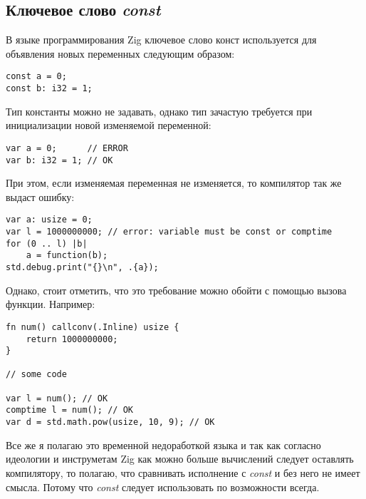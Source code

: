 \subsection{Ключевое слово \textit{const}}

В языке программирования Zig ключевое слово конст используется для объявления новых переменных следующим образом:
\begin{lstlisting}
const a = 0;
const b: i32 = 1;
\end{lstlisting}

Тип константы можно не задавать, однако тип зачастую требуется при инициализации новой изменяемой переменной:
\begin{lstlisting}
var a = 0;      // ERROR
var b: i32 = 1; // ОК
\end{lstlisting}

При этом, если изменяемая переменная не изменяется, то компилятор так же выдаст ошибку:
\begin{lstlisting}
var a: usize = 0;
var l = 1000000000; // error: variable must be const or comptime
for (0 .. l) |b|
    a = function(b);
std.debug.print("{}\n", .{a});
\end{lstlisting}

Однако, стоит отметить, что это требование можно обойти с помощью вызова функции. Например:
\begin{lstlisting}
fn num() callconv(.Inline) usize {
    return 1000000000;
}

// some code

var l = num(); // OK
comptime l = num(); // OK
var d = std.math.pow(usize, 10, 9); // OK
\end{lstlisting}

Все же я полагаю это временной недоработкой языка и так как согласно идеологии и инструметам Zig как можно больше вычислений следует оставлять компилятору, то полагаю, что сравнивать исполнение с \textit{const} и без него не имеет смысла. Потому что \textit{const} следует использовать по возможности всегда.
